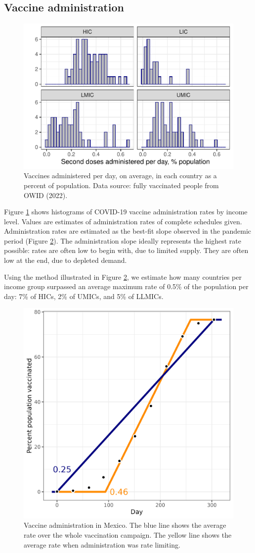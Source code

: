\documentclass[
]{article}
\begin{document}
\subsection{Vaccine administration}\label{vaccine-administration}

\begin{figure}
\includegraphics[width=0.5\linewidth]{README_files/figure-latex/vaxrate-1} \caption{Vaccines administered per day, on average, in each country as a percent of population. Data source: fully vaccinated people from OWID (2022).}\label{fig:vaxrate}
\end{figure}

Figure \ref{fig:vaxrate} shows histograms of COVID-19 vaccine administration rates by income level. Values are estimates of administration rates of complete schedules given. Administration rates are estimated as the best-fit slope observed in the pandemic period (Figure \ref{fig:vaxratemx}). The administration slope ideally represents the highest rate possible: rates are often low to begin with, due to limited supply. They are often low at the end, due to depleted demand.

Using the method illustrated in Figure \ref{fig:vaxratemx}, we estimate how many countries per income group surpassed an average maximum rate of 0.5\% of the population per day: 7\% of HICs, 2\% of UMICs, and 5\% of LLMICs.

\begin{figure}
\includegraphics[width=0.5\linewidth]{README_files/figure-gfm/vax_rate_MX} \caption{Vaccine administration in Mexico. The blue line shows the average rate over the whole vaccination campaign. The yellow line shows the average rate when administration was rate limiting.}\label{fig:vaxratemx}
\end{figure}
\end{document}
